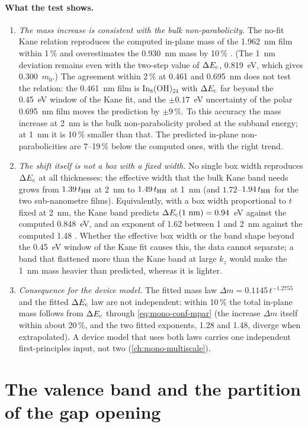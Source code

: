 \paragraph{What the test shows.}
\begin{enumerate}
\item \emph{The mass increase is consistent with the bulk non-parabolicity.} The no-fit Kane relation reproduces the
computed in-plane mass of the 1.962~nm film within 1\,\% and overestimates the 0.930~nm mass by 10\,\% .
(The 1~nm deviation remains even with the two-step value of $\Delta E_{\mathrm{c}}$, 0.819~eV, which gives 0.300~$m_0$.) The agreement
within 2\,\% at 0.461 and 0.695~nm does not test the relation: the 0.461~nm film is In$_8$(OH)$_{24}$ with $\Delta E_{\mathrm{c}}$ far
beyond the 0.45~eV window of the Kane fit, and the $\pm0.17$~eV uncertainty of the polar 0.695~nm film moves the
prediction by $\pm9$\,\%. To this accuracy the mass increase at 2~nm is the bulk non-parabolicity probed at the subband
energy; at 1~nm it is 10\,\% smaller than that. The predicted in-plane non-parabolicities are 7--19\,\% below the
computed ones, with the right trend.
\item \emph{The shift itself is not a box with a fixed width.} No single box width reproduces $\Delta E_{\mathrm{c}}$ at all
thicknesses: the effective width that the bulk Kane band needs grows from $1.39\,t_{\mathrm{HH}}$ at 2~nm to $1.49\,t_{\mathrm{HH}}$ at 1~nm
(and $1.72$--$1.94\,t_{\mathrm{HH}}$ for the two sub-nanometre films). Equivalently, with a box width proportional to $t$ fixed at
2~nm, the Kane band predicts $\Delta E_{\mathrm{c}}(1~\mathrm{nm}) = 0.94$~eV against the computed 0.848~eV, and an exponent of 1.62
between 1 and 2~nm against the computed 1.48 . Whether the effective box width or the band shape beyond the
0.45~eV window of the Kane fit causes this, the data cannot separate; a band that flattened more than the Kane band at
large $k_z$ would make the 1~nm mass heavier than predicted, whereas it is lighter.
\item \emph{Consequence for the device model.} The fitted mass law $\Delta m = 0.1145\,t^{-1.2755}$ and the fitted
$\Delta E_{\mathrm{c}}$ law are not independent: within 10\,\% the total in-plane mass follows from $\Delta E_{\mathrm{c}}$ through
\cref{eq:mono-conf-mpar} (the increase $\Delta m$ itself within about 20\,\%, and the two fitted exponents, 1.28 and 1.48,
diverge when extrapolated). A
device model that uses both laws carries one independent first-principles input, not two (\cref{ch:mono-multiscale}).
\end{enumerate}

\section{The valence band and the partition of the gap opening}
\label{sec:mono-conf-partition}

